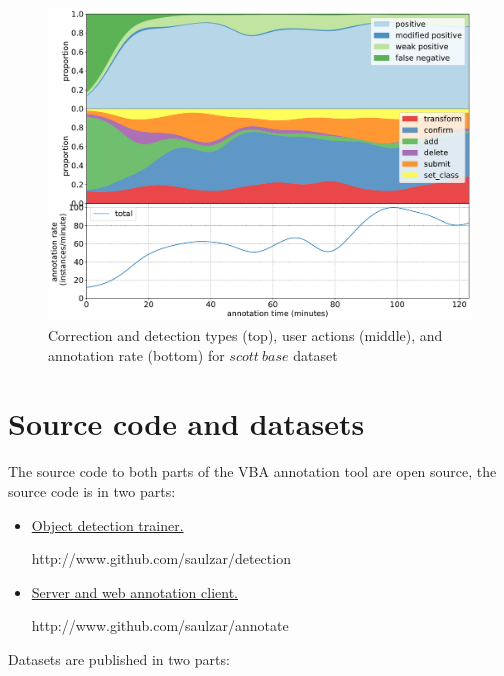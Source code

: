 \begin{figure}[!h]
\centering
\includegraphics[width=1.0\linewidth]{charts/action_annotations/scott_base.pdf}
\caption{ Correction and detection types (top), user actions (middle), and annotation rate (bottom) for $scott\:base$ dataset }
\label{fig:scott_base_annotation}
\end{figure}

\chapter{Source code and datasets}
\label{chap:resources} 

The source code to both parts of the \gls{VBA} annotation tool are open source, the source code is in two parts: 

\begin{itemize}
    \item \href{http://www.github.com/saulzar/detection}{Object detection trainer.} \par\noindent http://www.github.com/saulzar/detection
    \item \href{http://www.github.com/saulzar/annotate}{Server and web annotation client.} \par\noindent   http://www.github.com/saulzar/annotate
\end{itemize}
 
  
Datasets are published in two parts:
 
